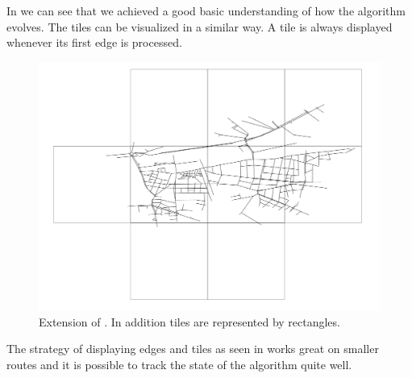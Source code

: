 \documentclass
[
    paper = a4,
    pagesize,
    12 pt,
    twoside,                       %
    open = right,
    DIV = calc,
    BCOR = 0 mm,                   %
    bibtotoc
]
{scrbook}
\begin{document}
In  we can see that we achieved a good basic understanding of how the algorithm evolves.
The tiles can be visualized in a similar way.
A tile is always displayed whenever its first edge is processed.

\begin{figure}
    \includegraphics[width=\textwidth]{Images/vis-rectangular-tiles-small.png}
\caption[]{Extension of . In addition tiles are represented by rectangles.}
\label{fig:rectangle_tiles}
\end{figure}

The strategy of displaying edges and tiles as seen in   works great on smaller routes and it is possible to track the state of the algorithm quite well.
\end{document}
